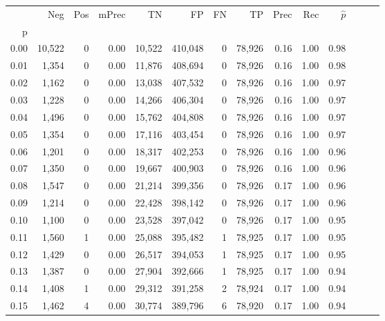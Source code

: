 \begin{tabular}{rrrrrrrrrrrrrr}
\toprule
{} &     Neg &    Pos & mPrec &       TN &       FP &      FN &      TP &  Prec &   Rec & $\hat{p}$ \\
p    &         &        &       &          &          &         &         &       &       &           \\
\midrule
0.00 &  10,522 &      0 &  0.00 &   10,522 &  410,048 &       0 &  78,926 &  0.16 &  1.00 &      0.98 \\
0.01 &   1,354 &      0 &  0.00 &   11,876 &  408,694 &       0 &  78,926 &  0.16 &  1.00 &      0.98 \\
0.02 &   1,162 &      0 &  0.00 &   13,038 &  407,532 &       0 &  78,926 &  0.16 &  1.00 &      0.97 \\
0.03 &   1,228 &      0 &  0.00 &   14,266 &  406,304 &       0 &  78,926 &  0.16 &  1.00 &      0.97 \\
0.04 &   1,496 &      0 &  0.00 &   15,762 &  404,808 &       0 &  78,926 &  0.16 &  1.00 &      0.97 \\
0.05 &   1,354 &      0 &  0.00 &   17,116 &  403,454 &       0 &  78,926 &  0.16 &  1.00 &      0.97 \\
0.06 &   1,201 &      0 &  0.00 &   18,317 &  402,253 &       0 &  78,926 &  0.16 &  1.00 &      0.96 \\
0.07 &   1,350 &      0 &  0.00 &   19,667 &  400,903 &       0 &  78,926 &  0.16 &  1.00 &      0.96 \\
0.08 &   1,547 &      0 &  0.00 &   21,214 &  399,356 &       0 &  78,926 &  0.17 &  1.00 &      0.96 \\
0.09 &   1,214 &      0 &  0.00 &   22,428 &  398,142 &       0 &  78,926 &  0.17 &  1.00 &      0.96 \\
0.10 &   1,100 &      0 &  0.00 &   23,528 &  397,042 &       0 &  78,926 &  0.17 &  1.00 &      0.95 \\
0.11 &   1,560 &      1 &  0.00 &   25,088 &  395,482 &       1 &  78,925 &  0.17 &  1.00 &      0.95 \\
0.12 &   1,429 &      0 &  0.00 &   26,517 &  394,053 &       1 &  78,925 &  0.17 &  1.00 &      0.95 \\
0.13 &   1,387 &      0 &  0.00 &   27,904 &  392,666 &       1 &  78,925 &  0.17 &  1.00 &      0.94 \\
0.14 &   1,408 &      1 &  0.00 &   29,312 &  391,258 &       2 &  78,924 &  0.17 &  1.00 &      0.94 \\
0.15 &   1,462 &      4 &  0.00 &   30,774 &  389,796 &       6 &  78,920 &  0.17 &  1.00 &      0.94 \\

\end{tabular}
